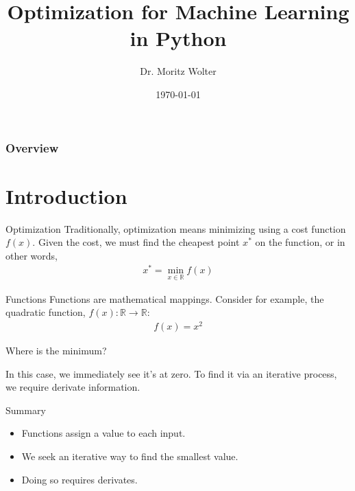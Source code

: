 \documentclass{beamer}
\title{Optimization for Machine Learning in Python}
\institute{High-Performance Computing and Analytics Lab, Uni Bonn}
\author{Dr. Moritz Wolter}
\date{\today}
\begin{document}
    \maketitle

    \begin{frame}
    \frametitle{Overview} 
    \tableofcontents
    \end{frame}

    \section{Introduction}
    \begin{frame}{Optimization}
      Traditionally, optimization means minimizing using a cost function $f(x)$.
      Given the cost, we must find the cheapest point $x^*$ on the function,
      or in other words,
      \begin{align}
       x^* = \min_{x \in \mathbb{R}} f(x)        
      \end{align}
    \end{frame}

    \begin{frame}{Functions}
      Functions are mathematical mappings. Consider for example, the quadratic function,
      $f(x): \mathbb{R} \rightarrow \mathbb{R}$:
      \begin{align}
        f(x) = x^2
      \end{align}

    \begin{figure}
      
    \end{figure}
    \end{frame}

    \begin{frame}{Where is the minimum?}
      \begin{figure}
        
      \end{figure}
      In this case, we immediately see it's at zero. To find it via an iterative process, we require derivate information.
    \end{frame}

    \begin{frame}{Summary}
      \begin{itemize}
        \item Functions assign a value to each input.
        \item We seek an iterative way to find the smallest value.
        \item Doing so requires derivates.
      \end{itemize}
    \end{frame}
\end{document}
